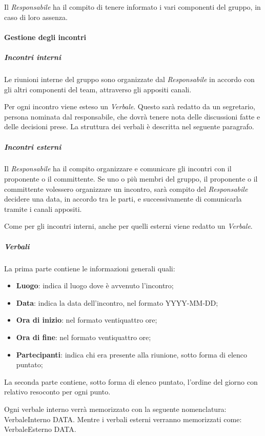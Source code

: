    					Il \textit{Responsabile} ha il compito di tenere informato i vari componenti del gruppo, in caso di loro assenza.
   			\paragraph{Gestione degli incontri}
   				\subparagraph{Incontri interni}
   					Le riunioni interne del gruppo sono organizzate dal \textit{Responsabile} in accordo con gli altri componenti del team, attraverso gli appositi canali.
   					
   					Per ogni incontro viene esteso un \textit{Verbale}. Questo sarà redatto da un segretario, persona nominata dal responsabile, che dovrà tenere nota delle discussioni fatte e delle decisioni prese. La struttura dei verbali è descritta nel seguente paragrafo. 
	   			\subparagraph{Incontri esterni}
   					Il \textit{Responsabile} ha il compito organizzare e comunicare gli incontri con il proponente o il committente. Se uno o più membri del gruppo, il proponente o il committente volessero organizzare un incontro, sarà compito del \textit{Responsabile} decidere una data, in accordo tra le parti, e successivamente di comunicarla tramite i canali appositi.
   					
   					Come per gli incontri interni, anche per quelli esterni viene redatto un \textit{Verbale}.
   				\subparagraph{Verbali}
   					La prima parte contiene le informazioni generali quali:
   					\begin{itemize}
   						\item \textbf{Luogo}: indica il luogo dove è avvenuto l'incontro;
   						\item \textbf{Data}: indica la data dell'incontro, nel formato YYYY-MM-DD;
   						\item \textbf{Ora di inizio}: nel formato ventiquattro ore;
   						\item \textbf{Ora di fine}: nel formato ventiquattro ore;
   						\item \textbf{Partecipanti}: indica chi era presente alla riunione, sotto forma di elenco puntato;
   					\end{itemize}
   					La seconda parte contiene, sotto forma di elenco puntato, l'ordine del giorno con relativo resoconto per ogni punto.
   					
   					Ogni verbale interno verrà memorizzato con la seguente nomenclatura: VerbaleInterno DATA.
   					Mentre i verbali esterni verranno memorizzati come: VerbaleEsterno DATA.
   					
